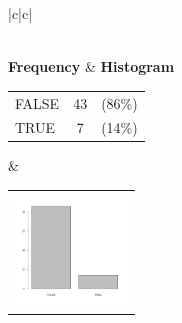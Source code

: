 


  
  \begin{center}
    \addtolength{\leftskip}{-4cm}\addtolength{\rightskip}{-4cm}
    \begin{tabular}{|c|c|}

      \hline
        \\
      \hline
        {\bf Frequency} & {\bf Histogram}  \\
          \begin{tabular}{@{}l@{ : }cl@{}}
            FALSE & 43 &(86\%) \\
            TRUE & 7 &(14\%) \\
          \end{tabular}
      &
          \begin{tabular}{@{}l@{}}
            \includegraphics[width=3cm]{graphUniv/V2-barplot}
          \end{tabular}
      \\ \hline 

    \end{tabular}
  \end{center}
  
  
